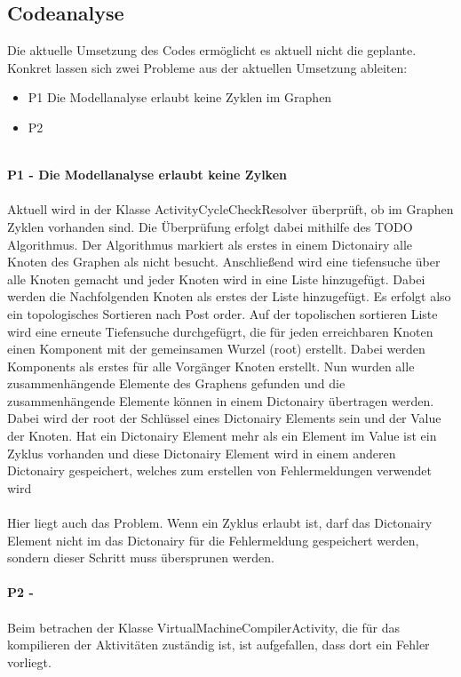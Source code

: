 \documentclass{article}
\begin{document}
    \subsection{Codeanalyse}
        Die aktuelle Umsetzung des Codes ermöglicht es aktuell nicht die geplante. Konkret lassen sich zwei Probleme aus der aktuellen Umsetzung ableiten:
        \begin{itemize}
            \item P1 Die Modellanalyse erlaubt keine Zyklen im Graphen
            \item P2 
        \end{itemize}\\
        \textbf{P1 - Die Modellanalyse erlaubt keine Zylken}\\
        \\
        Aktuell wird in der Klasse ActivityCycleCheckResolver überprüft, ob im Graphen Zyklen vorhanden sind. Die Überprüfung erfolgt dabei mithilfe des TODO Algorithmus.
        Der Algorithmus markiert als erstes in einem Dictonairy alle Knoten des Graphen als nicht besucht. 
        Anschließend wird eine tiefensuche über alle Knoten gemacht und jeder Knoten wird in eine Liste hinzugefügt. Dabei werden die Nachfolgenden Knoten als erstes der Liste hinzugefügt. Es erfolgt also ein topologisches Sortieren nach Post order.
        Auf der topolischen sortieren Liste wird eine erneute Tiefensuche durchgefügrt, die für jeden erreichbaren Knoten einen Komponent mit der gemeinsamen Wurzel (root) erstellt. Dabei werden Komponents als erstes für alle Vorgänger Knoten erstellt.
        Nun wurden alle zusammenhängende Elemente des Graphens gefunden und die zusammenhängende Elemente können in einem Dictonairy übertragen werden. Dabei wird der root der Schlüssel eines Dictonairy Elements sein und der Value der Knoten. 
        Hat ein Dictonairy Element mehr als ein Element im Value ist ein Zyklus vorhanden und diese Dictonairy Element wird in einem anderen Dictonairy gespeichert, welches zum erstellen von Fehlermeldungen verwendet wird\\
        \\
        Hier liegt auch das Problem. Wenn ein Zyklus erlaubt ist, darf das Dictonairy Element nicht im das Dictonairy für die Fehlermeldung gespeichert werden, sondern dieser Schritt muss übersprunen werden.\\
        \\
        \textbf{P2 -}\\
        \\
        Beim betrachen der Klasse VirtualMachineCompilerActivity, die für das kompilieren der Aktivitäten zuständig ist, ist aufgefallen, dass dort ein Fehler vorliegt.
        
\end{document}
